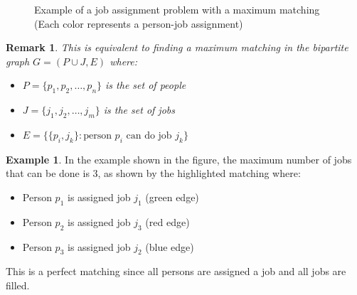 \documentclass{article}
\newtheorem{remark}{Remark}
\theoremstyle{definition}
\newtheorem{example}{Example}
\begin{document}
\begin{figure}[h]
\centering
{}
\caption{Example of a job assignment problem with a maximum matching (Each color represents a person-job assignment)}
\label{fig:job-assignment}
\end{figure}

\begin{remark}
This is equivalent to finding a maximum matching in the bipartite graph $G = (P \cup J, E)$ where:
\begin{itemize}
\item $P = \{p_1, p_2, \ldots, p_n\}$ is the set of people
\item $J = \{j_1, j_2, \ldots, j_m\}$ is the set of jobs
\item $E = \{\{p_i, j_k\} : \text{person } p_i \text{ can do job } j_k\}$
\end{itemize}
\end{remark}

\begin{example}
In the example shown in the figure, the maximum number of jobs that can be done is 3, as shown by the highlighted matching where:
\begin{itemize}
\item Person $p_1$ is assigned job $j_1$ (green edge)
\item Person $p_2$ is assigned job $j_3$ (red edge)
\item Person $p_3$ is assigned job $j_2$ (blue edge)
\end{itemize}
This is a perfect matching since all persons are assigned a job and all jobs are filled.
\end{example}
\end{document}
